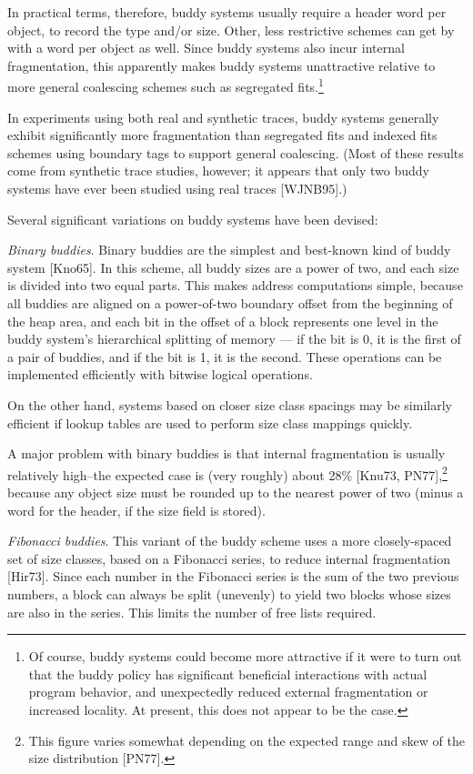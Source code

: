 \documentclass[a4paper,12pt,notitlepage,twoside,openright]{article}
\begin{document}
In practical terms, therefore, buddy systems usually require a header word
per object, to record the type and/or size. Other, less restrictive schemes can
get by with a word per object as well. Since buddy systems also incur internal
fragmentation, this apparently makes buddy systems unattractive relative to
more general coalescing schemes such as segregated fits.\footnote{Of course, buddy systems could become more attractive if it were to turn out that
the buddy policy has significant beneficial interactions with actual program behavior,
and unexpectedly reduced external fragmentation or increased locality. At present,
this does not appear to be the case.}

In experiments using both real and synthetic traces, buddy systems generally
exhibit significantly more fragmentation than segregated fits and indexed fits
schemes using boundary tags to support general coalescing. (Most of these results
come from synthetic trace studies, however; it appears that only two buddy
systems have ever been studied using real traces [WJNB95].)

Several significant variations on buddy systems have been devised:

\emph{Binary buddies}. Binary buddies are the simplest and best-known kind of buddy
system [Kno65]. In this scheme, all buddy sizes are a power of two, and each size
is divided into two equal parts. This makes address computations simple, because
all buddies are aligned on a power-of-two boundary offset from the beginning of
the heap area, and each bit in the offset of a block represents one level in the
buddy system's hierarchical splitting of memory --- if the bit is 0, it is the first of
a pair of buddies, and if the bit is 1, it is the second. These operations can be
implemented efficiently with bitwise logical operations.

On the other hand, systems based on closer size class spacings may be similarly
efficient if lookup tables are used to perform size class mappings quickly.

A major problem with binary buddies is that internal fragmentation is usually
relatively high--the expected case is (very roughly) about 28\% [Knu73, PN77],\footnote{
This figure varies somewhat depending on the expected range and skew of the size
distribution [PN77].
}
because any object size must be rounded up to the nearest power of two (minus
a word for the header, if the size field is stored).

\emph{Fibonacci buddies}. This variant of the buddy scheme uses a more closely-spaced
set of size classes, based on a Fibonacci series, to reduce internal fragmentation
[Hir73]. Since each number in the Fibonacci series is the sum of the two previous
numbers, a block can always be split (unevenly) to yield two blocks whose sizes
are also in the series. This limits the number of free lists required.
\end{document}
